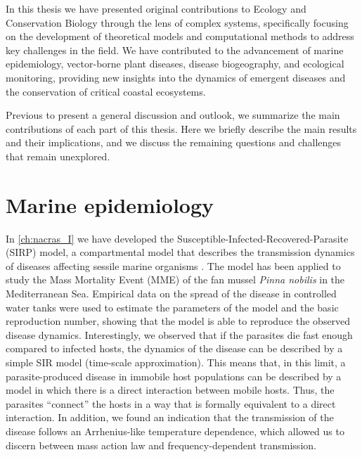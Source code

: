 
In this thesis we have presented original contributions to Ecology
and Conservation Biology through the lens of complex systems, specifically
focusing on the development of theoretical models and computational
methods to address key challenges in the field. We have contributed to the
advancement of marine epidemiology, vector-borne plant diseases, disease
biogeography, and ecological monitoring, providing new insights into the
dynamics of emergent diseases and the conservation of critical coastal
ecosystems.

Previous to present a general discussion and outlook, we summarize the main
contributions of each part of this thesis. Here we briefly describe the main
results and their implications, and we discuss the remaining questions and
challenges that remain unexplored.

\section{Marine epidemiology}

In \cref{ch:nacras_I} we have developed the
Susceptible-Infected-Recovered-Parasite (SIRP) model, a compartmental model
that describes the transmission dynamics of diseases affecting sessile marine
organisms \cite{GimenezRomero2021}. The model has been applied to
study the Mass Mortality Event (MME) of the fan mussel \textit{Pinna nobilis}
in the Mediterranean Sea. Empirical data on the spread of the disease in
controlled water tanks were used to estimate the parameters of the model and
the basic reproduction number, showing that the model is able to reproduce the
observed disease dynamics. Interestingly, we observed that if the parasites
die fast enough compared to infected hosts, the dynamics of the disease can
be described by a simple SIR model (time-scale approximation). This means that,
in this limit, a parasite-produced disease in immobile host populations can be
described by a model in which there is a direct interaction between mobile
hosts. Thus, the parasites ``connect'' the hosts in a way that is formally
equivalent to a direct interaction. In addition, we found an indication that
the transmission of the disease follows an Arrhenius-like temperature
dependence, which allowed us to discern between mass action law and
frequency-dependent transmission.

